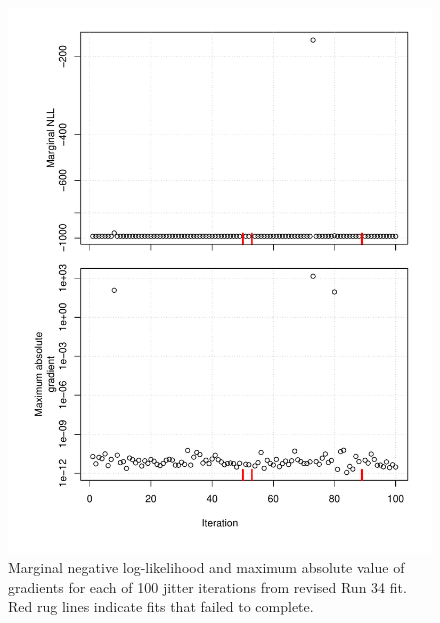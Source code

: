 \documentclass[
]{article}
\begin{document}
\begin{figure}

{\centering \includegraphics{bsb_models_wp_files/figure-latex/jitter-res-2-1} 

}

\caption{Marginal negative log-likelihood and maximum absolute value of gradients for each of 100 jitter iterations from revised Run 34 fit. Red rug lines indicate fits that failed to complete.}\label{fig:jitter-res-2}
\end{figure}
\end{document}
